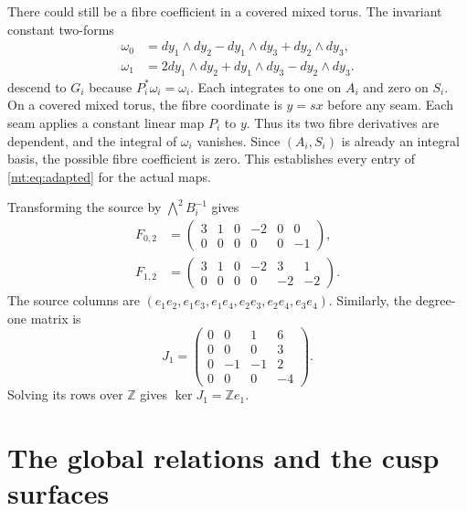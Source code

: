 There could still be a fibre coefficient in a covered mixed torus.
The invariant constant two-forms
\begin{equation}\label{mt:eq:forms}
\begin{aligned}
\omega_0&=dy_1\wedge dy_2-dy_1\wedge dy_3+dy_2\wedge dy_3,\\
\omega_1&=2dy_1\wedge dy_2+dy_1\wedge dy_3-dy_2\wedge dy_3.
\end{aligned}
\end{equation}
descend to $G_i$ because $P_i^*\omega_i=\omega_i$.
Each integrates to one on $A_i$ and zero on $S_i$.
On a covered mixed torus, the fibre coordinate is $y=sx$ before any seam.
Each seam applies a constant linear map $P_i$ to $y$.
Thus its two fibre derivatives are dependent, and the integral of $\omega_i$ vanishes.
Since $(A_i,S_i)$ is already an integral basis, the possible fibre coefficient is zero.
This establishes every entry of \eqref{mt:eq:adapted} for the actual maps.

Transforming the source by $\bigwedge^2B_i^{-1}$ gives
\begin{equation}\label{mt:eq:Fi}
\begin{aligned}
F_{0,2}&=\begin{pmatrix}3&1&0&-2&0&0\\0&0&0&0&0&-1\end{pmatrix},\\
F_{1,2}&=\begin{pmatrix}3&1&0&-2&3&1\\0&0&0&0&-2&-2\end{pmatrix}.
\end{aligned}
\end{equation}
The source columns are $(e_1e_2,e_1e_3,e_1e_4,e_2e_3,e_2e_4,e_3e_4)$.
Similarly, the degree-one matrix is
\begin{equation}\label{mt:eq:J1}
J_1=\begin{pmatrix}0&0&1&6\\0&0&0&3\\0&-1&-1&2\\0&0&0&-4\end{pmatrix}.
\end{equation}
Solving its rows over $\mathbb Z$ gives $\ker J_1=\mathbb Ze_1$.

\section{The global relations and the cusp surfaces}

